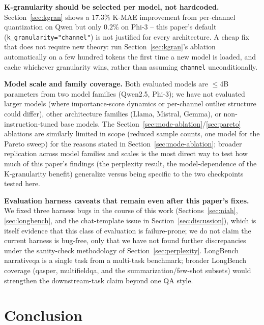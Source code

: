 \documentclass[conference]{IEEEtran}
\begin{document}
\textbf{K-granularity should be selected per model, not hardcoded.} Section~\ref{sec:kgran}
shows a $17.3\%$ K-MAE improvement from per-channel quantization on Qwen but only
$0.2\%$ on Phi-3 -- this paper's default (\texttt{k\_granularity="channel"}) is not
justified for every architecture. A cheap fix that does not require new theory: run
Section~\ref{sec:kgran}'s ablation automatically on a few hundred tokens the first time
a new model is loaded, and cache whichever granularity wins, rather than assuming
\texttt{channel} unconditionally.

\textbf{Model scale and family coverage.} Both evaluated models are $\le$4B parameters
from two model families (Qwen2.5, Phi-3); we have not evaluated larger models (where
importance-score dynamics or per-channel outlier structure could differ), other
architecture families (Llama, Mistral, Gemma), or non-instruction-tuned base models. The
Section~\ref{sec:mode-ablation}/\ref{sec:pareto} ablations are similarly limited in scope
(reduced sample counts, one model for the Pareto sweep) for the reasons stated in
Section~\ref{sec:mode-ablation}; broader replication across model families and scales
is the most direct way to test how much of this paper's findings (the perplexity result,
the model-dependence of the K-granularity benefit) generalize versus being specific to
the two checkpoints tested here.

\textbf{Evaluation harness caveats that remain even after this paper's fixes.} We fixed
three harness bugs in the course of this work (Sections~\ref{sec:niah},
\ref{sec:longbench}, and the chat-template issue in Section~\ref{sec:discussion}), which
is itself evidence that this class of evaluation is failure-prone; we do not claim the
current harness is bug-free, only that we have not found further discrepancies under the
sanity-check methodology of Section~\ref{sec:perplexity}. LongBench narrativeqa is a
single task from a multi-task benchmark; broader LongBench coverage (qasper,
multifieldqa, and the summarization/few-shot subsets) would strengthen the downstream-task
claim beyond one QA style.

\section{Conclusion}
\end{document}
